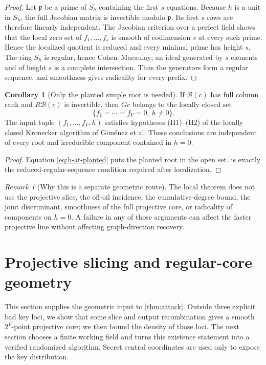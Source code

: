 \documentclass[11pt,a4paper]{article}
\theoremstyle{definition}
\newtheorem{corollary}[theorem]{Corollary}
\theoremstyle{remark}
\newtheorem{remark}[theorem]{Remark}
\begin{document}
\begin{proof}
Let $\mathfrak p$ be a prime of $S_h$ containing the first $s$ equations.  Because $h$ is a unit in $S_h$, the full Jacobian matrix is invertible modulo $\mathfrak p$.  Its first $s$ rows are therefore linearly independent.  The Jacobian criterion over a perfect field shows that the local zero set of $f_1,\ldots,f_s$ is smooth of codimension $s$ at every such prime.  Hence the localized quotient is reduced and every minimal prime has height $s$.  The ring $S_h$ is regular, hence Cohen--Macaulay; an ideal generated by $s$ elements and of height $s$ is a complete intersection.  Thus the generators form a regular sequence, and smoothness gives radicality for every prefix.
\end{proof}

\begin{corollary}[Only the planted simple root is needed]\label{cor:local-hypotheses}
If $\mathcal B(c)$ has full column rank and $R\mathcal B(c)$ is invertible, then $Gc$ belongs to the locally closed set
\[
 \{f_1=\cdots=f_V=0,\ h\ne0\}.
\]
The input tuple $(f_1,\ldots,f_V,h)$ satisfies hypotheses (H1)--(H2) of the locally closed Kronecker algorithm of Gim\'enez et al.  These conclusions are independent of every root and irreducible component contained in $h=0$.
\end{corollary}

\begin{proof}
Equation \eqref{eq:h-at-planted} puts the planted root in the open set.   is exactly the reduced-regular-sequence condition required after localization.
\end{proof}

\begin{remark}[Why this is a separate geometric route]\label{rem:local-independent}
The local theorem does not use the projective slice, the off-oil incidence, the cumulative-degree bound, the joint discriminant, smoothness of the full projective core, or radicality of components on $h=0$.  A failure in any of those arguments can affect the faster projective line without affecting graph-direction recovery.
\end{remark}

\section{Projective slicing and regular-core geometry}\label{sec:projective}

This section supplies the geometric input to \cref{thm:attack}.  Outside three explicit bad key loci, we show that some slice and output recombination gives a smooth $2^V$-point projective core; we then bound the density of those loci.  The next section chooses a finite working field and turns this existence statement into a verified randomized algorithm.  Secret central coordinates are used only to expose the key distribution.
\end{document}
